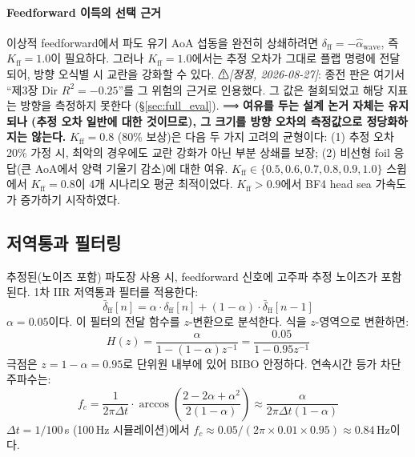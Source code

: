 \documentclass[11pt]{report}
\numberwithin{equation}{chapter}
\numberwithin{figure}{chapter}
\numberwithin{table}{chapter}
\begin{document}
\paragraph{Feedforward 이득의 선택 근거}
이상적 feedforward에서 파도 유기 AoA 섭동을 완전히 상쇄하려면
$\delta_{\text{ff}} = -\hat{\alpha}_{\text{wave}}$, 즉 $K_{\text{ff}} = 1.0$이 필요하다.
그러나 $K_{\text{ff}} = 1.0$에서는 추정 오차가 그대로 플랩 명령에 전달되어,
방향 오식별 시 교란을 강화할 수 있다.
⚠\emph{[정정, 2026-08-27]}: 종전 판은 여기서 ``제3장 Dir $R^2 = -0.25$''를 그 위험의
근거로 인용했다. 그 값은 철회되었고 해당 지표는 방향을 측정하지 못한다
(\S\ref{sec:full_eval}). ⟹ \textbf{여유를 두는 설계 논거 자체는 유지되나
(추정 오차 일반에 대한 것이므로), 그 크기를 방향 오차의 측정값으로 정당화하지는 않는다.}
$K_{\text{ff}} = 0.8$ (80\% 보상)은 다음 두 가지 고려의 균형이다:
(1) 추정 오차 20\% 가정 시, 최악의 경우에도 교란 강화가 아닌 부분 상쇄를 보장;
(2) 비선형 foil 응답(큰 AoA에서 양력 기울기 감소)에 대한 여유.
$K_{\text{ff}} \in \{0.5, 0.6, 0.7, 0.8, 0.9, 1.0\}$ 스윕에서
$K_{\text{ff}} = 0.8$이 4개 시나리오 평균 최적이었다.
$K_{\text{ff}} > 0.9$에서 BF4 head sea 가속도가 증가하기 시작하였다.

\subsection{저역통과 필터링}

추정된(노이즈 포함) 파도장 사용 시, feedforward 신호에
고주파 추정 노이즈가 포함된다.
1차 IIR 저역통과 필터를 적용한다:
\begin{equation}
  \bar{\delta}_{\text{ff}}[n] = \alpha \cdot \delta_{\text{ff}}[n]
    + (1 - \alpha) \cdot \bar{\delta}_{\text{ff}}[n-1]
\end{equation}
$\alpha = 0.05$이다. 이 필터의 전달 함수를 $z$-변환으로 분석한다.
식을 $z$-영역으로 변환하면:
\begin{equation}
  H(z) = \frac{\alpha}{1 - (1-\alpha)z^{-1}}
  = \frac{0.05}{1 - 0.95 z^{-1}}
  \label{eq:iir_tf}
\end{equation}
극점은 $z = 1 - \alpha = 0.95$로 단위원 내부에 있어 BIBO 안정하다.
연속시간 등가 차단 주파수는:
\begin{equation}
  f_c = \frac{1}{2\pi \Delta t} \cdot \arccos\!\left(\frac{2 - 2\alpha + \alpha^2}{2(1-\alpha)}\right)
  \approx \frac{\alpha}{2\pi \Delta t(1-\alpha)}
  \label{eq:cutoff}
\end{equation}
$\Delta t = 1/100$\,s (100\,Hz 시뮬레이션)에서
$f_c \approx 0.05 / (2\pi \times 0.01 \times 0.95) \approx 0.84$\,Hz이다.
\end{document}
